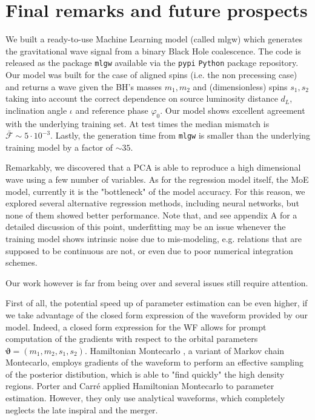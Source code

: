 \section{Final remarks and future prospects}
We built a ready-to-use Machine Learning model (called mlgw) which generates the gravitational wave signal from a binary Black Hole coalescence. The code is released as the package \texttt{mlgw} available via the \texttt{pypi} \texttt{Python} package repository. 
Our model was built for the case of aligned spins (i.e. the non precessing case) and returns a wave given the BH's masses $m_1, m_2$ and (dimensionless) spins $s_1, s_2$ taking into account the correct dependence on source luminosity distance $d_L$, inclination angle $\iota$ and reference phase $\varphi_0$.
Our model shows excellent agreement with the underlying training set. At test times the median mismatch is $\bar{\mathcal{F}}\sim 5 \cdot 10^{-3}$. Lastly, the generation time from \texttt{mlgw} is smaller than the underlying training model by a factor of $\sim 35$.
\par
Remarkably, we discovered that a PCA is able to reproduce a high dimensional wave using a few number of variables. As for the regression model itself, the MoE model, currently it is 
the "bottleneck" of the model accuracy. For this reason, we explored several alternative regression 
methods, including neural networks, but none of them showed better performance.
Note that, and see appendix A for a detailed discussion of this point, underfitting may be an issue
whenever the training model shows intrinsic noise due to mis-modeling, e.g. relations that 
are supposed to be continuous are not, or even due to poor numerical integration schemes.
\par
Our work however is far from being over and several issues still require attention.
\par
First of all, the potential speed up of parameter estimation can be even higher, if we take advantage of the closed form expression of the waveform provided by our model.
Indeed, a closed form expression for the WF allows for prompt computation of the gradients with respect to the orbital parameters $ \boldsymbol{\vartheta} = (m_1,m_2, {s}_1,{s}_2) $.
Hamiltonian Montecarlo \cite{betancourt2017hamiltonianMC}, a variant of Markov chain Montecarlo, employs gradients of the waveform to perform an effective sampling of the posterior distibution, which is able to "find quickly" the high density regions.
Porter and Carré \cite{Porter2014Hamiltonian_MonteCarlo} applied Hamiltonian Montecarlo to parameter estimation. However, they only use analytical waveforms, which completely neglects the late inspiral and the merger.
